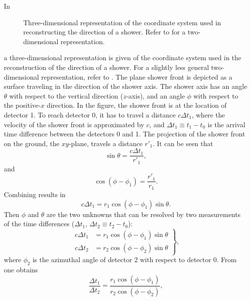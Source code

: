 In 
\begin{figure}
\centering

\caption{Three-dimensional representation of the coordinate system used in
reconstructing the direction of a shower. Refer to
 for a two-dimensional representation.}
\label{fig:reconstruction-coordinates}
\end{figure}
a three-dimensional representation is given of the coordinate system used in the
reconstruction of the direction of a shower. For a slightly less
general two-dimensional representation, refer to .
The plane shower front is depicted as a surface traveling in the direction of
the shower axis. The shower axis has an angle $\theta$ with respect to
the vertical direction ($z$-axis), and an angle $\phi$ with respect to the
positive-$x$ direction. In the figure, the shower front is at the location of
detector 1. To reach detector 0, it has to travel a distance $c\Delta t_1$, where the
velocity of the shower front is approximated by $c$, and $\Delta t_1 \equiv t_1
- t_0$ is the arrival time difference between the detectors 0 and 1. The
projection of the shower front on the ground, the $xy$-plane, travels a distance
$r'_1$. It can be seen that
\begin{equation}
\sin \theta = \frac{c \Delta t_1}{r'_1},
\label{eq:sintheta}
\end{equation}
and
\begin{equation}
\cos (\phi - \phi_1) = \frac{r'_1}{r_1}.
\label{eq:cosphi}
\end{equation}
Combining  results in
\begin{equation}
c \Delta t_1 = r_1 \cos (\phi - \phi_1) \sin \theta.
\label{eq:time_angle_relation}
\end{equation}
Then $\phi$ and $\theta$ are the two unknowns that can be resolved by two
measurements of the time differences ($\Delta t_1$, $\Delta t_2 \equiv t_2 -
t_0$):
\begin{equation}
\label{eq:system}
\left.\begin{aligned}
c \Delta t_1 &= r_1 \cos (\phi - \phi_1) \sin \theta \\
c \Delta t_2 &= r_2 \cos (\phi - \phi_2) \sin \theta
\end{aligned}\right\},
\end{equation}
where $\phi_2$ is the azimuthal angle of detector 2
with respect to detector 0. From  one obtains
\begin{equation}
\frac{\Delta t_1}{\Delta t_2} = \frac{r_1 \cos(\phi - \phi_1)}{r_2 \cos(\phi - \phi_2)},
\end{equation}
